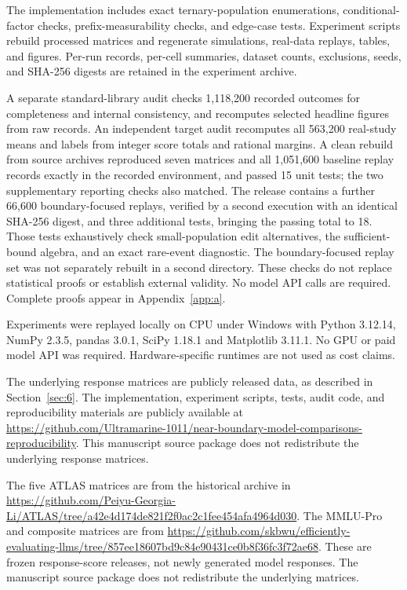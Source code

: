 The implementation includes exact ternary-population enumerations, conditional-factor checks, prefix-measurability checks, and edge-case tests. Experiment scripts rebuild processed matrices and regenerate simulations, real-data replays, tables, and figures. Per-run records, per-cell summaries, dataset counts, exclusions, seeds, and SHA-256 digests are retained in the experiment archive.

A separate standard-library audit checks 1,118,200 recorded outcomes for completeness and internal consistency, and recomputes selected headline figures from raw records. An independent target audit recomputes all 563,200 real-study means and labels from integer score totals and rational margins. A clean rebuild from source archives reproduced seven matrices and all 1,051,600 baseline replay records exactly in the recorded environment, and passed 15 unit tests; the two supplementary reporting checks also matched. The release contains a further 66,600 boundary-focused replays, verified by a second execution with an identical SHA-256 digest, and three additional tests, bringing the passing total to 18. Those tests exhaustively check small-population edit alternatives, the sufficient-bound algebra, and an exact rare-event diagnostic. The boundary-focused replay set was not separately rebuilt in a second directory. These checks do not replace statistical proofs or establish external validity. No model API calls are required. Complete proofs appear in Appendix~\ref{app:a}.

Experiments were replayed locally on CPU under Windows with Python 3.12.14, NumPy 2.3.5, pandas 3.0.1, SciPy 1.18.1 and Matplotlib 3.11.1. No GPU or paid model API was required. Hardware-specific runtimes are not used as cost claims.


The underlying response matrices are publicly released data, as described in Section~\ref{sec:6}. The implementation, experiment scripts, tests, audit code, and reproducibility materials are publicly available at \url{https://github.com/Ultramarine-1011/near-boundary-model-comparisons-reproducibility}. This manuscript source package does not redistribute the underlying response matrices.

The five ATLAS matrices are from the historical archive in \url{https://github.com/Peiyu-Georgia-Li/ATLAS/tree/a42e4d174de821f2f0ac2c1fee454afa4964d030}. The MMLU-Pro and composite matrices are from \url{https://github.com/skbwu/efficiently-evaluating-llms/tree/857ee18607bd9c84e90431ce0b8f36fc3f72ae68}. These are frozen response-score releases, not newly generated model responses. The manuscript source package does not redistribute the underlying matrices.
